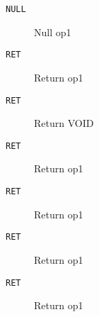 
\begin{description}
\item[\texttt{NULL       }]  Null op1\\
\end{description}

\begin{description}
\item[\texttt{RET        }]  Return op1\\
\end{description}

\begin{description}
\item[\texttt{RET        }]  Return VOID\\
\end{description}

\begin{description}
\item[\texttt{RET        }]  Return op1\\
\end{description}

\begin{description}
\item[\texttt{RET        }]  Return op1\\
\end{description}

\begin{description}
\item[\texttt{RET        }]  Return op1\\
\end{description}

\begin{description}
\item[\texttt{RET        }]  Return op1\\
\end{description}

